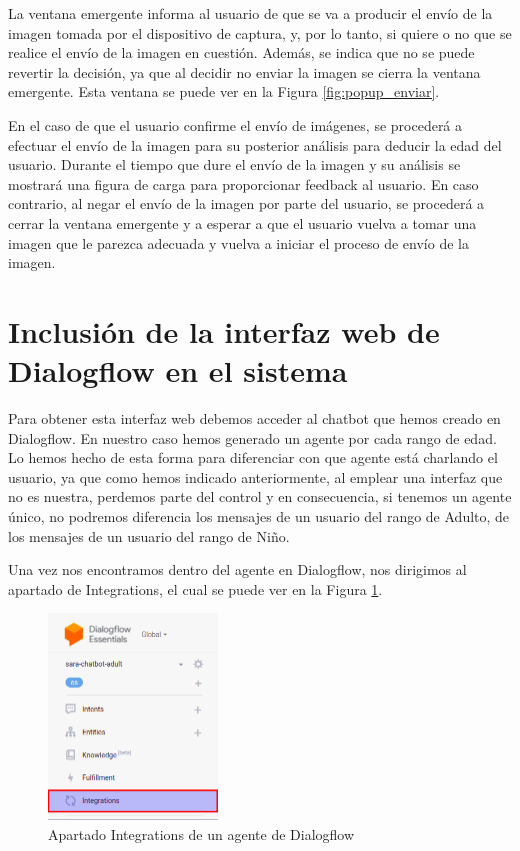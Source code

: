 \begin{itemize}
La ventana emergente informa al usuario de que se va a producir el envío de la imagen tomada por el dispositivo de captura, y, por lo tanto, si quiere o no que se realice el envío de la imagen en cuestión. Además, se indica que no se puede revertir la decisión, ya que al decidir no enviar la imagen se cierra la ventana emergente. Esta ventana se puede ver en la Figura \ref{fig:popup_enviar}.

En el caso de que el usuario confirme el envío de imágenes, se procederá a efectuar el envío de la imagen para su posterior análisis para deducir la edad del usuario. Durante el tiempo que dure el envío de la imagen y su análisis se mostrará una figura de carga para proporcionar feedback al usuario. En caso contrario, al negar el envío de la imagen por parte del usuario, se procederá a cerrar la ventana emergente y a esperar a que el usuario vuelva a tomar una imagen que le parezca adecuada y vuelva a iniciar el proceso de envío de la imagen.

\end{itemize}


\section{Inclusión de la interfaz web de Dialogflow en el sistema} \label{sec:inclu_interfaz_web}

Para obtener esta interfaz web debemos acceder al chatbot que hemos creado en Dialogflow. En nuestro caso hemos generado un agente por cada rango de edad. Lo hemos hecho de esta forma para diferenciar con que agente está charlando el usuario, ya que como hemos indicado anteriormente, al emplear una interfaz que no es nuestra, perdemos parte del control y en consecuencia, si tenemos un agente único, no podremos diferencia los mensajes de un usuario del rango de Adulto, de los mensajes de un usuario del rango de Niño.

Una vez nos encontramos dentro del agente en Dialogflow, nos dirigimos al apartado de Integrations, el cual se puede ver en la Figura \ref{fig:integrations_dialogflow}.

\begin{figure}[h]
\centering
\includegraphics[width=0.4\textwidth]{imagenes/07_Implementacion/integrations_dialogflow.png}
\caption{Apartado Integrations de un agente de Dialogflow}
\label{fig:integrations_dialogflow}
\end{figure}

